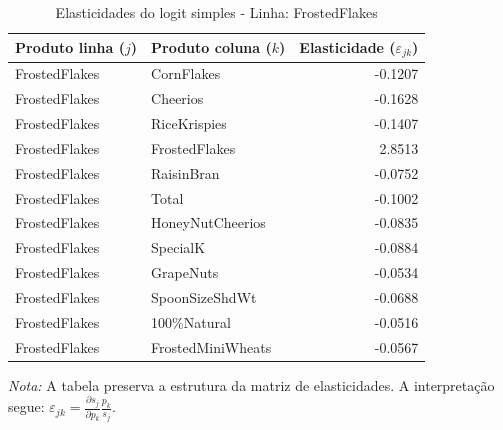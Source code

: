 \begingroup
\begin{table}[H]
\centering
\caption{Elasticidades do logit simples - Linha: FrostedFlakes}
\label{tab:elas-frostedflakes}
\small
\begin{tabular}{llr}
\toprule
Produto linha ($j$) & Produto coluna ($k$) & Elasticidade ($\varepsilon_{jk}$) \\
\midrule
FrostedFlakes & CornFlakes & -0.1207 \\
FrostedFlakes & Cheerios & -0.1628 \\
FrostedFlakes & RiceKrispies & -0.1407 \\
FrostedFlakes & FrostedFlakes & 2.8513 \\
FrostedFlakes & RaisinBran & -0.0752 \\
FrostedFlakes & Total & -0.1002 \\
FrostedFlakes & HoneyNutCheerios & -0.0835 \\
FrostedFlakes & SpecialK & -0.0884 \\
FrostedFlakes & GrapeNuts & -0.0534 \\
FrostedFlakes & SpoonSizeShdWt & -0.0688 \\
FrostedFlakes & 100\%Natural & -0.0516 \\
FrostedFlakes & FrostedMiniWheats & -0.0567 \\
\bottomrule
\end{tabular}

\vspace{0.3em}
\footnotesize
\textit{Nota:} A tabela preserva a estrutura da matriz de elasticidades. A interpretação segue: $\varepsilon_{jk}=\frac{\partial s_j}{\partial p_k}\frac{p_k}{s_j}$.
\end{table}
\endgroup


